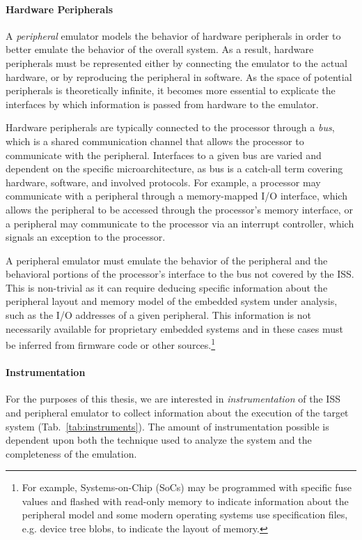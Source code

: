 \paragraph{Hardware Peripherals}
\label{sec:periphs}

A \emph{peripheral} emulator models the behavior of hardware peripherals in order to better emulate the behavior of the overall system.
As a result, hardware peripherals must be represented either by connecting the emulator to the actual hardware, or by reproducing the peripheral in software.
As the space of potential peripherals is theoretically infinite, it becomes more essential to explicate the interfaces by which information is passed from hardware to the emulator.

Hardware peripherals are typically connected to the processor through a \emph{bus}, which is a shared communication channel that allows the processor to communicate with the peripheral.
Interfaces to a given bus are varied and dependent on the specific microarchitecture, as bus is a catch-all term covering hardware, software, and involved protocols.
For example, a processor may communicate with a peripheral through a memory-mapped I/O interface, which allows the peripheral to be accessed through the processor's memory interface, or a peripheral may communicate to the processor via an interrupt controller, which signals an exception to the processor.

A peripheral emulator must emulate the behavior of the peripheral and the behavioral portions of the processor's interface to the bus not covered by the ISS.
This is non-trivial as it can require deducing specific information about the peripheral layout and memory model of the embedded system under analysis, such as the I/O addresses of a given peripheral.
This information is not necessarily available for proprietary embedded systems and in these cases must be inferred from firmware code or other sources.\footnote{For example, Systems-on-Chip (SoCs) may be programmed with specific fuse values and flashed with read-only memory to indicate information about the peripheral model and some modern operating systems use specification files, e.g. device tree blobs, to indicate the layout of memory.}

\paragraph{Instrumentation}

For the purposes of this thesis, we are interested in \emph{instrumentation} of the ISS and peripheral emulator to collect information about the execution of the target system (Tab.~\ref{tab:instruments}).
The amount of instrumentation possible is dependent upon both the technique used to analyze the system and the completeness of the emulation.

